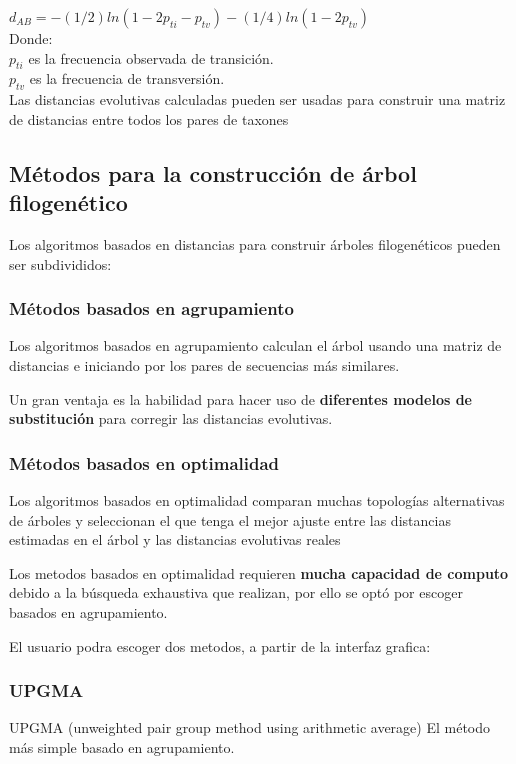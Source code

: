 \documentclass[a4paper]{article}
\begin{document}
$d_{AB} = −(1/2) ln(1 − 2p_{ti} − p_{tv}) − (1/4) ln(1 − 2p_{tv})$\\

\noindent Donde:\\
$p_{ti}$ es la frecuencia observada de transición.\\
$p_{tv}$ es la frecuencia de transversión.\\

\noindent Las distancias evolutivas calculadas pueden ser usadas para
construir una matriz de distancias entre todos los pares de taxones

\subsection{Métodos para la construcción de árbol filogenético}	

Los algoritmos basados en distancias para construir árboles
filogenéticos pueden ser subdivididos:

\subsubsection*{Métodos basados en agrupamiento}

Los algoritmos basados en agrupamiento calculan el árbol
usando una matriz de distancias e iniciando por los pares de
secuencias más similares.

Un gran ventaja es la habilidad para hacer uso de \textbf{diferentes modelos de substitución} para corregir las distancias evolutivas.

\subsubsection*{Métodos basados en optimalidad}

Los algoritmos basados en optimalidad comparan muchas
topologías alternativas de árboles y seleccionan el que tenga el
mejor ajuste entre las distancias estimadas en el árbol y las
distancias evolutivas reales

\noindent Los metodos basados en optimalidad requieren \textbf{mucha capacidad de computo} debido a la búsqueda exhaustiva que realizan, por ello se optó por escoger basados en agrupamiento.

El usuario podra escoger dos metodos, a partir de la interfaz grafica:
\subsubsection{UPGMA}
UPGMA (unweighted pair group method using arithmetic average)
El método más simple basado en agrupamiento.
\end{document}
